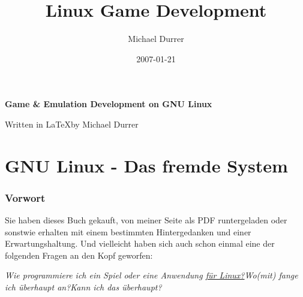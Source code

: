 \documentclass[b5paper,10pt,dvips,fleqn,titlepage,twoside]{book}
\author{Michael Durrer}
\title{Linux Game Development}
\date{2007-01-21}
\begin{document}
\begin{titlepage}
\begin{center}
\begin{huge} \textbf{Game \& Emulation Development on GNU Linux}\end{huge}
\newline
\newline
\begin{small}Written in \LaTeX by Michael Durrer\newline\end{small}
\end{center}
\end{titlepage}
\newpage
\tableofcontents
\setcounter{secnumdepth}{2}
\part{GNU Linux - Das fremde System}
\section{Vorwort}
Sie haben dieses Buch gekauft, von meiner Seite als PDF runtergeladen oder sonstwie erhalten mit einem bestimmten Hintergedanken und einer Erwartungshaltung. Und vielleicht haben sich auch schon einmal eine der folgenden Fragen an den Kopf geworfen:

\begin{flushleft}
\emph{
Wie programmiere ich ein Spiel oder eine Anwendung \underline{f\"{u}r Linux?}\newline Wo(mit) fange ich \"{u}berhaupt an?\newline Kann ich das \"{u}berhaupt?}\newline
\end{flushleft}
\end{document}
